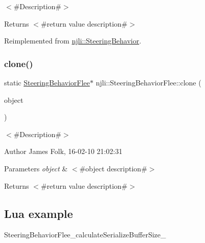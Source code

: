$<$\#\+Description\#$>$

\begin{DoxyReturn}{Returns}
$<$\#return value description\#$>$ 
\end{DoxyReturn}


Reimplemented from \mbox{\hyperlink{classnjli_1_1_steering_behavior_abbc461d853c1b225cfde5b79d96d11bd}{njli\+::\+Steering\+Behavior}}.

\mbox{\label{classnjli_1_1_steering_behavior_flee_ab1b25c046e2b7f1333762e467d822669}} 
\subsubsection{\texorpdfstring{clone()}{clone()}}
{\footnotesize\ttfamily static \mbox{\hyperlink{classnjli_1_1_steering_behavior_flee}{Steering\+Behavior\+Flee}}$\ast$ njli\+::\+Steering\+Behavior\+Flee\+::clone (\begin{DoxyParamCaption}\item[{const \mbox{\hyperlink{classnjli_1_1_steering_behavior_flee}{Steering\+Behavior\+Flee}} \&}]{object }\end{DoxyParamCaption})\hspace{0.3cm}{\ttfamily [static]}}



$<$\#\+Description\#$>$ 

\begin{DoxyAuthor}{Author}
James Folk, 16-\/02-\/10 21\+:02\+:31
\end{DoxyAuthor}

\begin{DoxyParams}{Parameters}
{\em object} & $<$\#object description\#$>$\\
\hline
\end{DoxyParams}
\begin{DoxyReturn}{Returns}
$<$\#return value description\#$>$
\end{DoxyReturn}
\hypertarget{classnjli_1_1_steering_behavior_wander_ex1}{}\subsection{Lua example}\label{classnjli_1_1_steering_behavior_wander_ex1}

\begin{DoxyCodeInclude}
\end{DoxyCodeInclude}
Steering\+Behavior\+Flee\+\_\+calculate\+Serialize\+Buffer\+Size\+\_\+ \mbox{\label{classnjli_1_1_steering_behavior_flee_aab44be6e0c476eab26a281c939af37b6}} 

